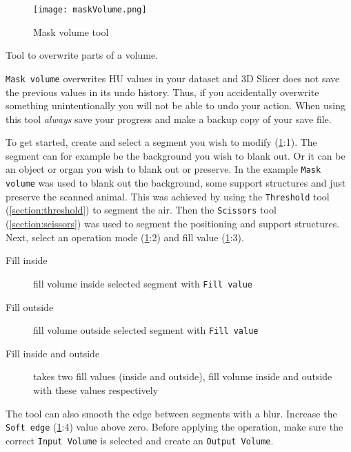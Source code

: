 \begin{figure}[h!]
	\centerline{
		\texttt{[image: maskVolume.png]}}
	\caption{Mask volume tool}\label{fig:mv}
\end{figure}

\noindent
Tool to overwrite parts of a volume.
\newline %
\newline %
\begin{minipage}{0.4\textwidth}
	\begin{center}
		
	\end{center}
\end{minipage}%
%
\begin{minipage}{0.5\textwidth}
	\texttt{Mask volume} overwrites HU values in your dataset and 3D Slicer does not save the previous values in its undo history.
	Thus, if you accidentally overwrite something unintentionally you will not be able to undo your action.
	When using this tool \emph{always} save your progress and make a backup copy of your save file.
\end{minipage}

To get started, create and select a segment you wish to modify (\cref{fig:mv}:1).
The segment can for example be the background you wish to blank out.
Or it can be an object or organ you wish to blank out or preserve.
In the example  \texttt{Mask volume} was used to blank out the background, some support structures and just preserve the scanned animal.
This was achieved by using the \texttt{Threshold} tool (\cref{section:threshold}) to segment the air.
Then the \texttt{Scissors} tool (\cref{section:scissors}) was used to segment the positioning and support structures.
Next, select an operation mode (\cref{fig:mv}:2) and fill value (\cref{fig:mv}:3).
\newline
\begin{description}
	\item [Fill inside] fill volume inside selected segment with \texttt{Fill value}
	\item [Fill outside] fill volume outside selected segment with \texttt{Fill value}
	\item [Fill inside and outside] takes two fill values (inside and outside), fill volume inside and outside with these values respectively
\end{description}
The tool can also smooth the edge between segments with a blur. Increase the \texttt{Soft edge} (\cref{fig:mv}:4) value above zero.
Before applying the operation, make sure the correct \texttt{Input Volume} is selected and create an \texttt{Output Volume}.

